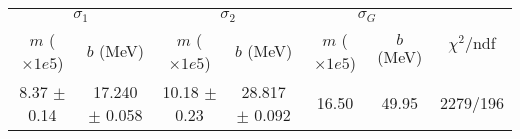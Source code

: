 \begin{tabular}{cc|cc|cc||c}
\multicolumn{2}{c|}{$\sigma_1$} & \multicolumn{2}{|c}{$\sigma_2$} & \multicolumn{2}{|c}{$\sigma_G$}  & \multirow{2}{*}{$\chi^2/$ndf}\\
$m$ ($\times1e5$) & $b$ (MeV) & $m$ ($\times1e5$) & $b$ (MeV) & $m$ ($\times1e5$) & $b$ (MeV) & \\
\hline
8.37 $\pm$ 0.14 & 17.240 $\pm$ 0.058 & 10.18 $\pm$ 0.23 & 28.817 $\pm$ 0.092 & 16.50 & 49.95 & 2279/196\\
\end{tabular}
